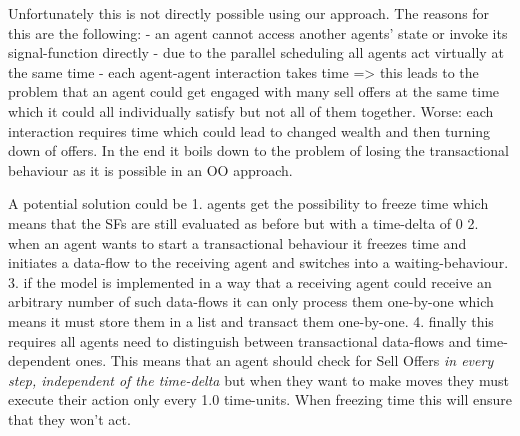 Unfortunately this is not directly possible using our approach. The reasons for this are the following:
- an agent cannot access another agents' state or invoke its signal-function directly
- due to the parallel scheduling all agents act virtually at the same time 
- each agent-agent interaction takes time 
=> this leads to the problem that an agent could get engaged with many sell offers at the same time which it could all individually satisfy but not all of them together. Worse: each interaction requires time which could lead to changed wealth and then turning down of offers. In the end it boils down to the problem of losing the transactional behaviour as it is possible in an OO approach.

A potential solution could be
1. agents get the possibility to freeze time which means that the SFs are still evaluated as before but with a time-delta of 0
2. when an agent wants to start a transactional behaviour it freezes time and initiates a data-flow to the receiving agent and switches into a waiting-behaviour.
3. if the model is implemented in a way that a receiving agent could receive an arbitrary number of such data-flows it can only process them one-by-one which means it must store them in a list and transact them one-by-one.
4. finally this requires all agents need to distinguish between transactional data-flows and time-dependent ones. This means that an agent should check for Sell Offers \textit{in every step, independent of the time-delta} but when they want to make moves they must execute their action only every 1.0 time-units. When freezing time this will ensure that they won't act.